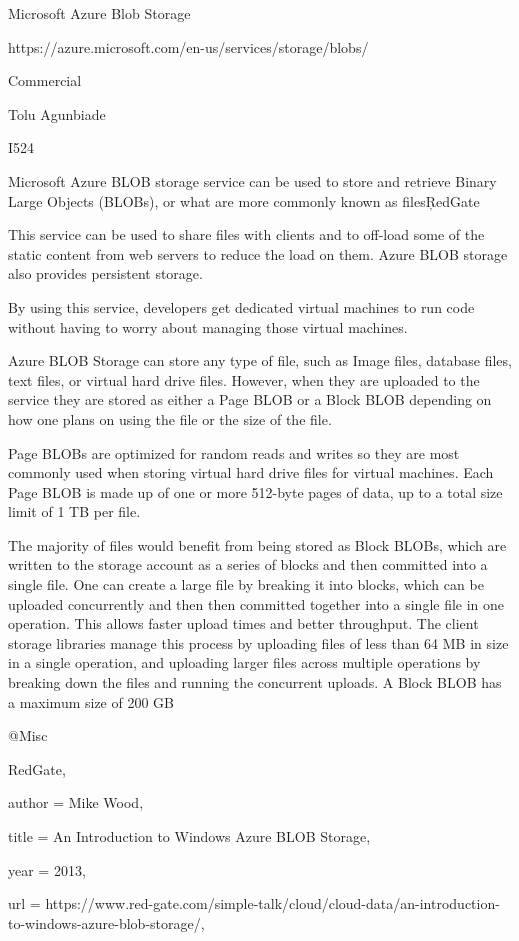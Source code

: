 Microsoft Azure Blob Storage

https://azure.microsoft.com/en-us/services/storage/blobs/

Commercial

Tolu Agunbiade

I524

Microsoft Azure BLOB storage service can be used to store and retrieve Binary Large Objects (BLOBs), or what are more commonly known as files\c{RedGate}

This service can be used to share files with clients and to off-load some of the static content from web servers to reduce the load on them. Azure BLOB storage also provides persistent storage. 

By using this service, developers get dedicated virtual machines to run code without having to worry about managing those virtual machines. 

Azure BLOB Storage can store any type of file, such as Image files, database files, text files, or virtual hard drive files. However, when they are uploaded to the service they are stored as either a Page BLOB or a Block BLOB depending on how one plans on using the file or the size of the file.

Page BLOBs are optimized for random reads and writes so they are most commonly used when storing virtual hard drive files for virtual machines. Each Page BLOB is made up of one or more 512-byte pages of data, up to a total size limit of 1 TB per file.

The majority of files would benefit from being stored as Block BLOBs, which are written to the storage account as a series of blocks and then committed into a single file. One can create a large file by breaking it into blocks, which can be uploaded concurrently and then then committed together into a single file in one operation. This allows faster upload times and better throughput. The client storage libraries manage this process by uploading files of less than 64 MB in size in a single operation, and uploading larger files across multiple operations by breaking down the files and running the concurrent uploads. A Block BLOB has a maximum size of 200 GB\cite{RedGate}

@Misc{RedGate,

  author = {Mike Wood},

  title  = {An Introduction to Windows Azure BLOB Storage},

  year   = {2013},

url = {https://www.red-gate.com/simple-talk/cloud/cloud-data/an-introduction-to-windows-azure-blob-storage/},

}
